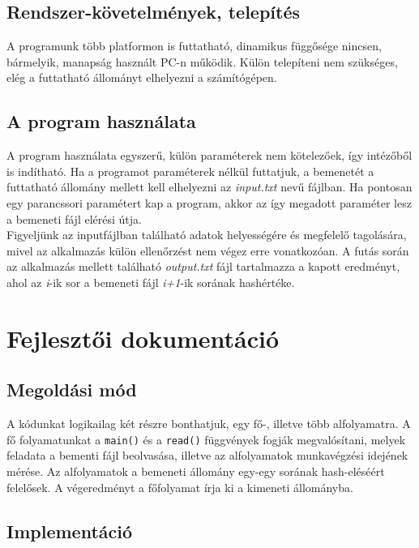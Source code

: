 \documentclass[12pt]{article}
\begin{document}
\subsection{Rendszer-követelmények, telepítés}

A programunk több platformon is futtatható, dinamikus függősége nincsen, bármelyik, manapság használt PC-n működik. Külön telepíteni nem szükséges, elég a futtatható állományt elhelyezni a számítógépen.

\subsection{A program használata}

A program használata egyszerű, külön paraméterek nem kötelezőek, így intézőből
is indítható. Ha a programot paraméterek nélkül futtatjuk, a bemenetét a futtatható
állomány mellett kell elhelyezni az \textit{input.txt} nevű fájlban. Ha pontosan egy
parancssori paramétert kap a program, akkor az így megadott paraméter lesz a bemeneti
fájl elérési útja.
\\
Figyeljünk az inputfájlban található adatok helyességére és megfelelő tagolására, mivel
az alkalmazás külön ellenőrzést nem végez erre vonatkozóan. A futás során az alkalmazás
mellett található \textit{output.txt} fájl tartalmazza a kapott eredményt, ahol az
\textit{i}-ik sor a bemeneti fájl \textit{i+1}-ik sorának hashértéke.

\section{Fejlesztői dokumentáció}

\subsection{Megoldási mód}

A kódunkat logikailag két részre bonthatjuk, egy fő-, illetve több alfolyamatra.
A fő folyamatunkat a \verb|main()| és a \verb|read()| függvények fogják megvalósítani,
melyek feladata a bementi fájl beolvasása, illetve az alfolyamatok munkavégzési
idejének mérése. Az alfolyamatok a bemeneti állomány egy-egy sorának hash-eléséért
felelősek. A végeredményt a főfolyamat írja ki a kimeneti állományba.

\subsection{Implementáció}
\end{document}
